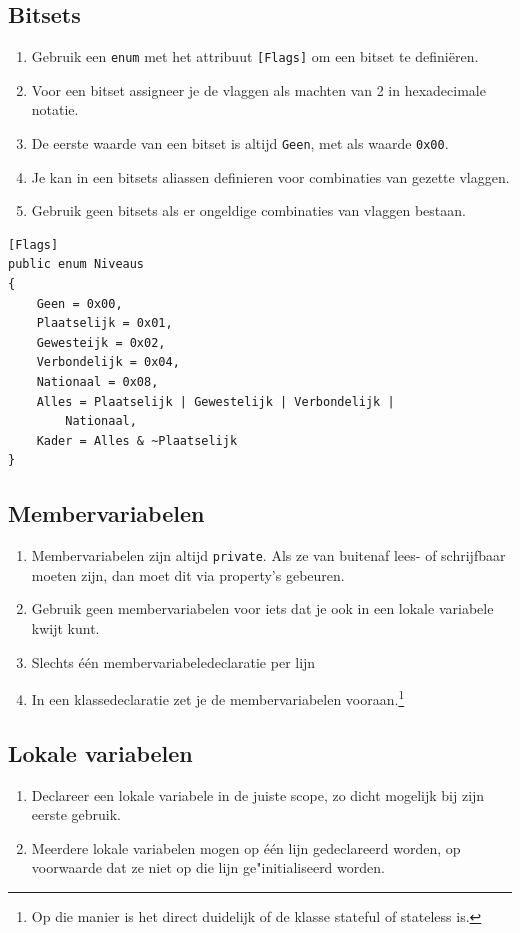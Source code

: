 \documentclass[a4paper,11pt]{article}
\begin{document}
\subsection{Bitsets}
\begin{enumerate}[resume]
\item Gebruik een \lstinline!enum! met het attribuut \lstinline ![Flags]! om een bitset
te defini\"eren.
\item Voor een bitset assigneer je de vlaggen als machten van 2 in
hexadecimale notatie.
\item De eerste waarde van een bitset is altijd \lstinline !Geen!, met als
waarde \lstinline !0x00!.
\item Je kan in een bitsets aliassen definieren voor combinaties van
gezette vlaggen.
\item Gebruik geen bitsets als er ongeldige combinaties van vlaggen
bestaan.
\end{enumerate}

\begin{lstlisting}[float,caption=Bitsets]
[Flags]
public enum Niveaus
{
	Geen = 0x00,
	Plaatselijk = 0x01,
	Gewesteijk = 0x02,
	Verbondelijk = 0x04,
	Nationaal = 0x08,
	Alles = Plaatselijk | Gewestelijk | Verbondelijk | 
		Nationaal,
	Kader = Alles & ~Plaatselijk
}
\end{lstlisting}

\subsection{Membervariabelen}
\begin{enumerate}[resume]
\item Membervariabelen zijn altijd \lstinline !private!.  Als ze van
buitenaf lees- of schrijfbaar moeten zijn, dan moet dit via property's gebeuren.
\item Gebruik geen membervariabelen voor iets dat je ook in een lokale variabele kwijt kunt.
\item Slechts \'e\'en membervariabeledeclaratie per lijn
\item In een klassedeclaratie zet je de membervariabelen vooraan.\footnote{Op die manier is het direct duidelijk of de klasse stateful of stateless
is.}
\end{enumerate}

\subsection{Lokale variabelen}
\begin{enumerate}[resume]
\item Declareer een lokale variabele in de juiste scope, zo dicht mogelijk
bij zijn eerste gebruik.
\item Meerdere lokale variabelen mogen op \'e\'en lijn gedeclareerd worden,
op voorwaarde dat ze niet op die lijn ge"initialiseerd
worden.
\end{enumerate}
\end{document}
